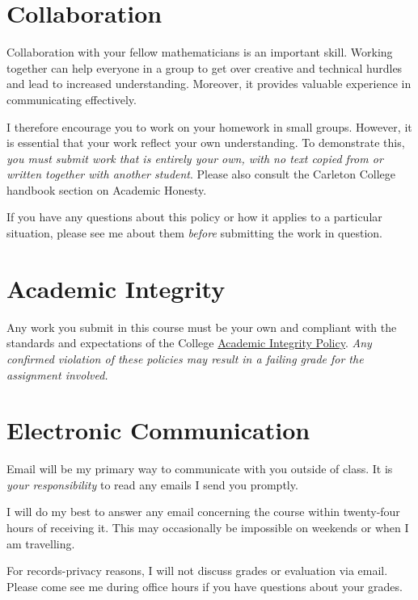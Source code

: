 \documentclass[11pt,article]{memoir}
\begin{document}
\section*{Collaboration}
Collaboration with your fellow mathematicians is an important skill.
Working together can help everyone in a group to get over creative and technical hurdles and lead to increased understanding.
Moreover, it provides valuable experience in communicating effectively.

I therefore encourage you to work on your homework in small groups.
However, it is essential that your work reflect your own understanding.
To demonstrate this, \emph{you must submit work that is entirely your own, with no text copied from or written together with another student}.
Please also consult the Carleton College handbook section on Academic Honesty.

If you have any questions about this policy or how it applies to a particular situation, please see me about them \emph{before} submitting the work in question.

\section*{Academic Integrity}
Any work you submit in this course must be your own and compliant with the standards and expectations of the College \href{https://apps.carleton.edu/campus/doc/integrity/}{Academic Integrity Policy}.
\emph{Any confirmed violation of these policies may result in a failing grade for the assignment involved.}

\section*{Electronic Communication}
Email will be my primary way to communicate with you outside of class.
It is \emph{your responsibility} to read any emails I send you promptly.

I will do my best to answer any email concerning the course within twenty-four hours of receiving it.
This may occasionally be impossible on weekends or when I am travelling.

For records-privacy reasons, I will not discuss grades or evaluation via email.
Please come see me during office hours if you have questions about your grades.
\end{document}
